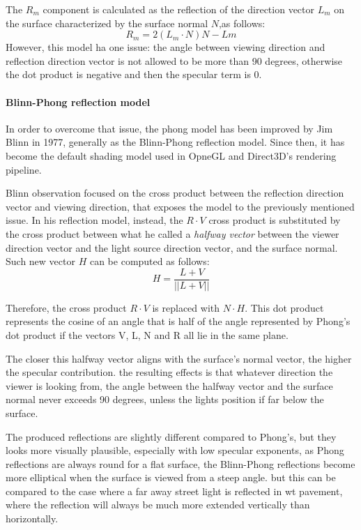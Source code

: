 \documentclass[12pt,a4paper]{extarticle}
\newcommand{\linespace}{\vspace{8pt}}
\begin{document}
The $R_{m}$ component is calculated as the reflection of the direction vector $L_{m}$ on the surface characterized by the surface normal $N$,as follows:
\[
R_{m} = 2(L_{m} \cdot N)N - L{m}
\]
However, this model ha one issue: the angle between viewing direction and reflection direction vector  is not allowed to be more than 90 degrees, otherwise the dot product is negative and then the specular term is 0.
\paragraph{Blinn-Phong reflection model}
In order to overcome that issue, the phong model has been improved by Jim Blinn in 1977, %
generally as the Blinn-Phong reflection model. Since then, it has become the default shading model used in OpneGL and Direct3D's rendering pipeline. %


Blinn observation focused on the cross product between the reflection direction vector and viewing direction, that exposes the model to the previously mentioned issue. In his reflection model, instead, the $R \cdot V$ cross product is substituted by the cross product between what he called a \textit{halfway vector} between the viewer direction vector and the light source direction vector, and the surface normal. Such new vector $H$ can be computed as follows: %
\[
H = \frac{L + V}{||L+V||}
\]

Therefore, the cross product $R \cdot V$ is replaced with $N \cdot H$.
This dot product represents the cosine of an angle that is half of the angle represented by Phong's dot product if the vectors V, L, N and R all lie in the same plane.

The closer this halfway vector aligns with the surface's normal vector, the higher the specular contribution. the resulting effects is that whatever direction the viewer is looking from, the angle between the halfway vector and the surface normal never exceeds 90 degrees, unless the lights position if far below the surface.
\linespace

The produced reflections are slightly different compared to Phong's, but they looks more visually plausible, especially with low specular exponents, as Phong reflections are always round for a flat surface, the Blinn-Phong reflections become more elliptical when the surface is viewed from a steep angle. but this can be compared to the case where a far away street light is reflected in wt pavement, where the reflection will always be much more extended vertically than horizontally.
\end{document}
